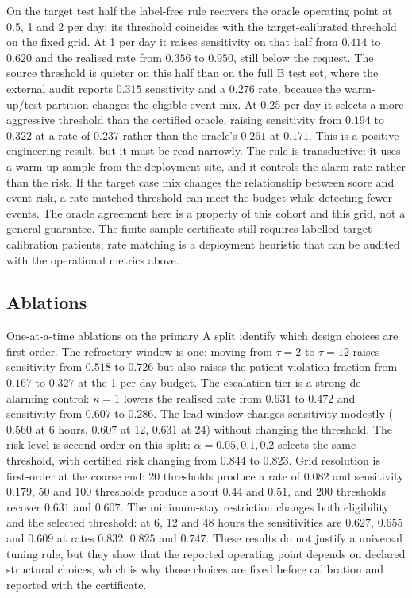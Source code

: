 On the target test half the label-free rule recovers the oracle operating point at 0.5, 1 and 2 per day: its threshold coincides with the target-calibrated threshold on the fixed grid. At 1 per day it raises sensitivity on that half from $0.414$ to $0.620$ and the realised rate from $0.356$ to $0.950$, still below the request. The source threshold is quieter on this half than on the full B test set, where the external audit reports $0.315$ sensitivity and a $0.276$ rate, because the warm-up/test partition changes the eligible-event mix. At 0.25 per day it selects a more aggressive threshold than the certified oracle, raising sensitivity from $0.194$ to $0.322$ at a rate of $0.237$ rather than the oracle's $0.261$ at $0.171$. This is a positive engineering result, but it must be read narrowly. The rule is transductive: it uses a warm-up sample from the deployment site, and it controls the alarm rate rather than the risk. If the target case mix changes the relationship between score and event risk, a rate-matched threshold can meet the budget while detecting fewer events. The oracle agreement here is a property of this cohort and this grid, not a general guarantee. The finite-sample certificate still requires labelled target calibration patients; rate matching is a deployment heuristic that can be audited with the operational metrics above.

\subsection{Ablations}
\label{sec:ablation}

One-at-a-time ablations on the primary A split identify which design choices are first-order. The refractory window is one: moving from $\tau=2$ to $\tau=12$ raises sensitivity from $0.518$ to $0.726$ but also raises the patient-violation fraction from $0.167$ to $0.327$ at the 1-per-day budget. The escalation tier is a strong de-alarming control: $\kappa=1$ lowers the realised rate from $0.631$ to $0.472$ and sensitivity from $0.607$ to $0.286$. The lead window changes sensitivity modestly ($0.560$ at 6 hours, $0.607$ at 12, $0.631$ at 24) without changing the threshold. The risk level is second-order on this split: $\alpha=0.05,0.1,0.2$ selects the same threshold, with certified risk changing from $0.844$ to $0.823$. Grid resolution is first-order at the coarse end: 20 thresholds produce a rate of $0.082$ and sensitivity $0.179$, 50 and 100 thresholds produce about $0.44$ and $0.51$, and 200 thresholds recover $0.631$ and $0.607$. The minimum-stay restriction changes both eligibility and the selected threshold: at 6, 12 and 48 hours the sensitivities are $0.627$, $0.655$ and $0.609$ at rates $0.832$, $0.825$ and $0.747$. These results do not justify a universal tuning rule, but they show that the reported operating point depends on declared structural choices, which is why those choices are fixed before calibration and reported with the certificate.

